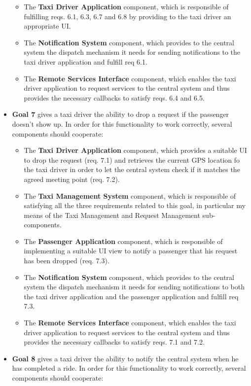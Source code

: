\begin{itemize}
\begin{itemize}
	\item The \textbf{Taxi Driver Application} component, which is responsible of fulfilling reqs. 6.1, 6.3, 6.7 and 6.8 by providing to the taxi driver an appropriate UI.
	\item The \textbf{Notification System} component, which provides to the central system the dispatch mechanism it needs for sending notifications to the taxi driver application and fulfill req 6.1.
	\item The \textbf{Remote Services Interface} component, which enables the taxi driver application to request services to the central system and thus provides the necessary callbacks to satisfy reqs. 6.4 and 6.5.
	\end{itemize}
	\item \textbf{Goal 7} gives a taxi driver the ability to drop a request if the passenger doesn't show up. In order for this functionality to work correctly, several components should cooperate:
	\begin{itemize}
	\item The \textbf{Taxi Driver Application} component, which provides a suitable UI to drop the request (req. 7.1) and retrieves the current GPS location fo the taxi driver in order to let the central system check if it matches the agreed meeting point (req. 7.2).
	\item The \textbf{Taxi Management System} component, which is responsible of satisfying all the three requirements related to this goal, in particular my means of the Taxi Management and Request Management sub-components.
	\item The \textbf{Passenger Application} component, which is responsible of implementing a suitable UI view to notify a passenger that his request has been dropped (req. 7.3).
	\item The \textbf{Notification System} component, which provides to the central system the dispatch mechanism it needs for sending notifications to both the taxi driver application and the passenger application and fulfill req 7.3.
	\item The \textbf{Remote Services Interface} component, which enables the taxi driver application to request services to the central system and thus provides the necessary callbacks to satisfy reqs. 7.1 and 7.2.
	\end{itemize}
	\item \textbf{Goal 8} gives a taxi driver the ability to notify the central system when he has completed a ride. In order for this functionality to work correctly, several components should cooperate:

\end{itemize}
